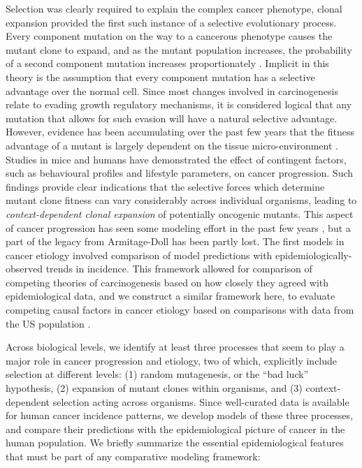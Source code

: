 \documentclass[9pt,twocolumn,twoside]{pnas-new}
\begin{document}
Selection was clearly required to explain the complex cancer phenotype, clonal expansion provided the first such instance of a selective evolutionary process. Every component mutation on the way to a cancerous phenotype causes the mutant clone to expand, and as the mutant population increases, the probability of a second component mutation increases proportionately \cite{Nowell1976}. Implicit in this theory is the assumption that every component mutation has a selective advantage over the normal cell. Since most changes involved in carcinogenesis relate to evading growth regulatory mechanisms, it is considered logical that any mutation that allows for such evasion will have a natural selective advantage. However, evidence has been accumulating over the past few years that the fitness advantage of a mutant is largely dependent on the tissue micro-environment \cite{Hanahan2012, Pietras2010}. Studies in mice \cite{Cao2010} and humans \cite{Rundqvist2013} have demonstrated the effect of contingent factors, such as behavioural profiles and lifestyle parameters, on cancer progression. Such findings provide clear indications that the selective forces which determine mutant clone fitness can vary considerably across individual organisms, leading to \textit{context-dependent clonal expansion} of potentially oncogenic mutants. This aspect of cancer progression has seen some modeling effort in the past few years \cite{Nagy2007, Caulin2011, Hochberg2017}, but a part of the legacy from Armitage-Doll has been partly lost. The first models in cancer etiology involved comparison of model predictions with epidemiologically-observed trends in incidence. This framework allowed for comparison of competing theories of carcinogenesis based on how closely they agreed with epidemiological data, and we construct a similar framework here, to evaluate competing causal factors in cancer etiology based on comparisons with data from the US population \cite{AmericanCancerSociety2016}.

Across biological levels, we identify at least three processes that seem to play a major role in cancer progression and etiology, two of which, explicitly include selection at different levels: (1) random mutagenesis, or the ``bad luck'' hypothesis, (2) expansion of mutant clones within organisms, and (3) context-dependent selection acting across organisms. Since well-curated data is available for human cancer incidence patterns, we develop models of these three processes, and compare their predictions with the epidemiological picture of cancer in the human population. We briefly summarize the essential epidemiological features that must be part of any comparative modeling framework:
\end{document}

